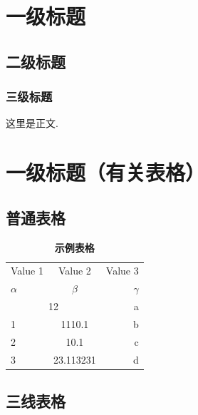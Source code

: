 \documentclass[12pt, a4paper, oneside]{ctexart}
\begin{document}
\newpage
\setcounter{page}{1}

\section{一级标题}

    \subsection{二级标题}

        \subsubsection{三级标题}

这里是正文. 


\section{一级标题（有关表格）}

    \subsection{普通表格}

    \begin{table}[h!]
        \begin{center}
            \caption{\songti {}\bfseries 示例表格}
            \begin{tabular}{l|c|r} %
            \toprule
            \textrm{Value 1} & \textrm{Value 2} & \textrm{Value 3}\\
            $\alpha$ & $\beta$ & $\gamma$ \\
            \hline
            \multicolumn{2}{c|}{12} & a\\ %
            \hline
            1 & 1110.1 & b\\
            2 & 10.1 & c\\
            3 & 23.113231 & d\\
            \bottomrule
            \end{tabular}
        \end{center}
    \end{table}

    \subsection{三线表格}
\end{document}
